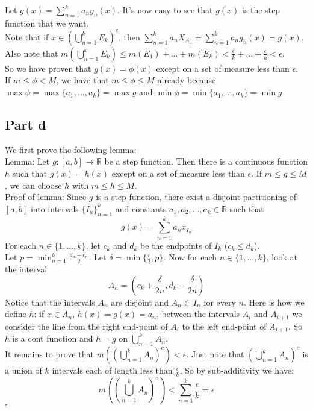 \documentclass[12pt]{article}
\begin{document}
Let $g(x)=\sum_{n=1}^k a_ng_n(x)$. It's now easy to see that $g(x)$ is the step function that we want. \\
Note that if $x \in (\bigcup_{n=1}^k E_k)^c$, then
$\sum_{n=1}^k a_nX_{A_n}=\sum_{n=1}^k a_ng_n(x)=g(x)$.
\\
Also note that 
$m(\bigcup_{n=1}^k E_k) \le m(E_1)+...+m(E_k) <
\frac{\epsilon}{k}+...+\frac{\epsilon}{k}< \epsilon$.
\\
So we have proven that $g(x)=\phi(x)$ except on a set of measure less than $\epsilon$.
\\
If $m \le \phi < M$, we have that $m \le \phi \le M$ already because $\max \phi = \max \{a_1,...,a_k\}=\max g$ and $\min \phi = \min \{a_1,...,a_k\}=\min g$

\clearpage
\subsection*{Part d}
We first prove the following lemma: \\
Lemma: Let $g: [a,b] \rightarrow \mathbb{R}$ be a step function. Then there is a continuous function $h$ such that $g(x)=h(x)$ except on a set of measure less than $\epsilon$. If $m \le g \le M$, we can choose $h$ with $m \le h \le M$.  \\
Proof of lemma:
Since $g$ is a step function, there exist a disjoint partitioning of $[a,b]$ into intervals $\{I_n\}_{n=1}^{k}$ and constants $a_1,a_2,...,a_k \in \mathbb{R}$ such that 
$$g(x)=\sum_{n=1}^{k} a_nx_{I_n}$$
For each $n \in \{1,...,k\}$, let $c_k$ and $d_k$ be the endpoints of $I_k$ ($c_k \le d_k$). \\
Let $p=\min_{n=1}^k \frac{d_n-c_n}{2}$. Let 
$\delta = \min \{\frac{\epsilon}{2},p\}$.
Now for each $n \in \{1,...,k\}$, look at the interval
$$A_n=(c_k+\frac{\delta}{2n},d_k-\frac{\delta}{2n})$$
Notice that the intervals $A_n$ are disjoint and $A_n \subset I_n$ for every $n$. Here is how we define $h$: 
if $x \in A_n$, $h(x)=g(x)=a_n$, between the intervals $A_i$ and $A_{i+1}$ we consider the line from the right end-point of $A_i$ to the left end-point of $A_{i+1}$. So $h$ is a cont function and $h=g$ on $\bigcup_{n=1}^k A_n$. \\
It remains to prove that $m ((\bigcup_{n=1}^k A_n)^c) < \epsilon$. Just note that $(\bigcup_{n=1}^k A_n)^c$ is a union of $k$ intervals each of length less than $\frac{\epsilon}{k}$, So by sub-additivity we have:
$$m ((\bigcup_{n=1}^k A_n)^c) < \sum_{n=1}^k \frac{\epsilon}{k} = \epsilon$$ $\square$ \\
\end{document}
